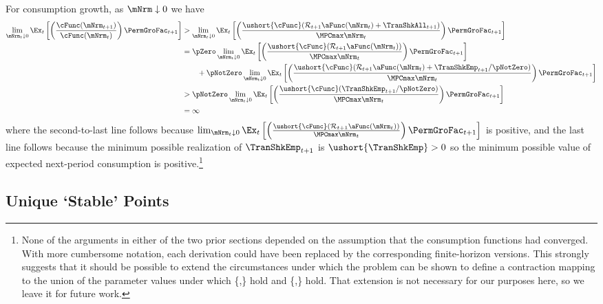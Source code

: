 \documentclass[BufferStockTheory]{subfiles}
\begin{document}
For consumption growth, as $\mNrm \downarrow 0$ we have
\begin{align*}
  \lim_{\mNrm_{t} \downarrow 0} \Ex_{t}\left[\left(\frac{\cFunc({\mNrm}_{t+1})}{\cFunc(\mNrm_t)}\right){\PermGroFac}_{t+1}\right]
  & > \lim_{\mNrm_{t} \downarrow 0} \Ex_{t}\left[\left(\frac{\ushort{\cFunc}({\mathcal{\mathcal{R}}}_{t+1}\aFunc(\mNrm_{t})+{%
    \TranShkAll}_{t+1})}{\MPCmax \mNrm_{t}}\right){\PermGroFac}_{t+1}\right]  \notag \\
  & = \pZero \lim_{\mNrm_{t} \downarrow 0} \Ex_{t}\left[\left(\frac{\ushort{\cFunc}({\mathcal{\mathcal{R}}}_{t+1}\aFunc(\mNrm_{t}))}{\MPCmax \mNrm_{t}}\right){\PermGroFac}_{t+1}\right] \\
  & ~~~~~~ + \pNotZero \lim_{\mNrm_{t} \downarrow 0}  \Ex_{t}\left[\left(\frac{\ushort{\cFunc}({\mathcal{\mathcal{R}}}_{t+1}\aFunc(\mNrm_{t})+
    \TranShkEmp_{t+1}/\pNotZero)}{\MPCmax \mNrm_{t}}\right){\PermGroFac}_{t+1}\right]  \\\notag
  & > \pNotZero \lim_{\mNrm_{t} \downarrow 0} \Ex_{t}\left[\left(\frac{\ushort{\cFunc}(
    \TranShkEmp_{t+1}/\pNotZero)}{\MPCmax \mNrm_{t}}\right){\PermGroFac}_{t+1}\right] \\
  & = \infty \nonumber
\end{align*}
where the second-to-last line follows because  $\lim_{\mNrm_{t} \downarrow 0} \Ex_{t}\left[\left(\frac{\ushort{\cFunc}({\mathcal{\mathcal{R}}}_{t+1}\aFunc(\mNrm_{t}))}{\MPCmax \mNrm_{t}}\right){\PermGroFac}_{t+1}\right]$ is positive, and the last line follows because the minimum possible realization of $\TranShkEmp_{t+1}$ is $\ushort{\TranShkEmp}>0$ so the minimum possible value of expected next-period consumption is positive.\footnote{None of the arguments in either of the two prior sections depended on the assumption that the consumption functions had converged.  With more cumbersome notation, each derivation could have been replaced by the corresponding finite-horizon versions.  This strongly suggests that it should be possible to extend the circumstances under which the problem can be shown to define a contraction mapping to the union of the parameter values under which \{\RIC,\FHWC\} hold and \{\FVAC,\WRIC\} hold.  That extension is not necessary for our purposes here, so we leave it for future work.}

\hypertarget{onetarget}{}
\hypertarget{Unique-Stable-Points}{}

\subsection{Unique `Stable' Points}\label{subsec:onetarget}\hypertarget{TheoremTarget}{}
\end{document}

